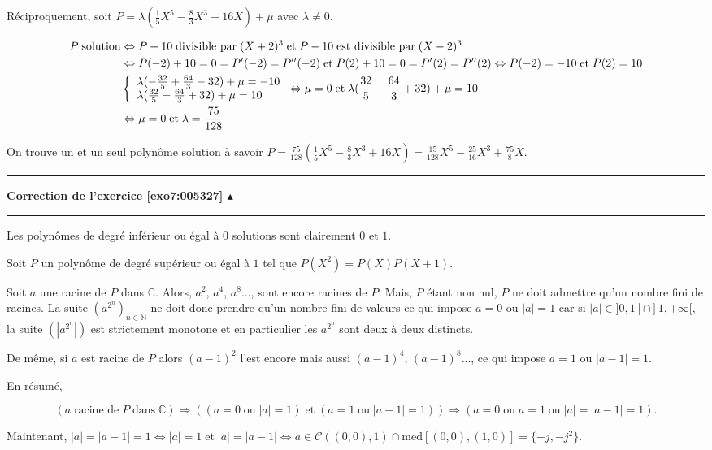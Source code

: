 \documentclass[11pt,a4paper]{article}
\newcommand{\Nn}{\mathbb{N}} \newcommand{\N}{\mathbb{N}}
\newcommand{\Cc}{\mathbb{C}} \newcommand{\C}{\mathbb{C}}
\newcounter{exo}
\newcommand{\correction}[1]{\hypertarget{cor7:#1}{}\label{cor7:#1}{\bf Correction de \hyperlink{exo7:#1}{l'exercice \ref{exo7:#1} $\blacktriangle$}}\vspace{1mm}\hrule\vspace{1mm}}
\newcommand{\fincorrection}{\vspace{1mm}\hrule\vspace*{7mm}}
\begin{document}
Réciproquement, soit $P=\lambda(\frac{1}{5}X^5-\frac{8}{3}X^3+16X)+\mu$ avec $\lambda\neq0$.

\begin{align*}\ensuremath
P\;\mbox{solution}&\Leftrightarrow P+10\;\mbox{divisible par}\;(X+2)^3\;\mbox{et}\;P-10\;\mbox{est divisible par}\;(X-2)^3\\
 &\Leftrightarrow P(-2)+10=0=P'(-2)=P''(-2)\;\mbox{et}\;P(2)+10=0=P'(2)=P''(2)\Leftrightarrow P(-2)=-10\;\mbox{et}\;P(2)=10\\
 &\left\{
 \begin{array}{l}
 \lambda(-\frac{32}{5}+\frac{64}{3}-32)+\mu=-10\\
  \lambda(\frac{32}{5}-\frac{64}{3}+32)+\mu=10
  \end{array}
  \right.
  \Leftrightarrow\mu=0\;\mbox{et}\;\lambda(\frac{32}{5}-\frac{64}{3}+32)+\mu=10\\
  &\Leftrightarrow\mu=0\;\mbox{et}\;\lambda=\frac{75}{128}
\end{align*}

On trouve un et un seul polynôme solution à savoir $P=\frac{75}{128}(\frac{1}{5}X^5-\frac{8}{3}X^3+16X)=\frac{15}{128}X^5-\frac{25}{16}X^3+\frac{75}{8}X$.
\fincorrection
\correction{005327}
Les polynômes de degré inférieur ou égal à $0$ solutions sont clairement $0$ et $1$.

Soit $P$ un polynôme de degré supérieur ou égal à $1$ tel que $P(X^2)=P(X)P(X+1)$.

Soit $a$ une racine de $P$ dans $\Cc$. Alors, $a^2$, $a^4$, $a^8$..., sont encore racines de $P$. Mais, $P$ étant non nul, $P$ ne doit admettre qu'un nombre fini de racines. La suite $(a^{2^n})_{n\in\Nn}$ ne doit donc prendre qu'un nombre fini de valeurs ce qui impose $a=0$ ou $|a|=1$ car si $|a|\in]0,1[\cap]1,+\infty[$, la suite $(|a^{2^n}|)$ est strictement monotone et en particulier les $a^{2^n}$ sont deux à deux distincts.

De même, si $a$ est racine de $P$ alors $(a-1)^2$ l'est encore mais aussi $(a-1)^4$, $(a-1)^8$..., ce qui impose $a=1$ ou $|a-1|=1$.

En résumé,

$$(a\;\mbox{racine de}\;P\;\mbox{dans}\;\Cc)\Rightarrow((a=0\;\mbox{ou}\;|a|=1)\;\mbox{et}\;(a=1\;\mbox{ou}\;|a-1|= 1))\Rightarrow(a=0\;\mbox{ou}\;a=1\;\mbox{ou}\;|a|=|a-1|=1).$$

Maintenant, $|a|=|a-1|=1\Leftrightarrow|a|=1\;\mbox{et}\;|a|=|a-1|\Leftrightarrow a\in\mathcal{C}((0,0),1)\cap\mbox{med}[(0,0),(1,0)]=\{-j,-j^2\}$.
\end{document}
